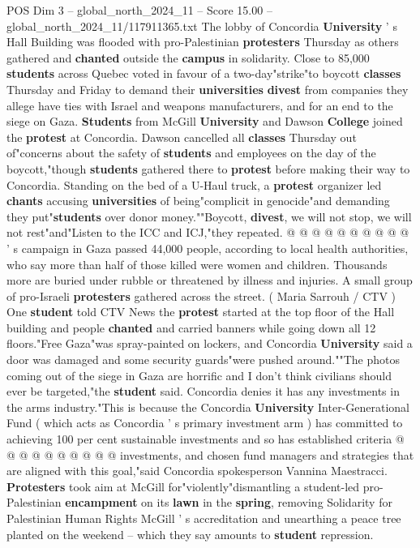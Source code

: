 \begin{textsample}{POS Dim 3 – global\_north\_2024\_11 – Score 15.00 – global\_north\_2024\_11/117911365.txt}  \label{ex:f3_pos_176}
The lobby of Concordia \textbf{University} ' s Hall Building was flooded with pro-Palestinian \textbf{protesters} Thursday as others gathered and \textbf{chanted} outside the \textbf{campus} in solidarity.
Close to 85,000 \textbf{students} across Quebec voted in favour of a two-day"strike"to boycott \textbf{classes} Thursday and Friday to demand their \textbf{universities} \textbf{divest} from companies they allege have ties with Israel and weapons manufacturers, and for an end to the siege on Gaza. \textbf{Students} from McGill \textbf{University} and Dawson \textbf{College} joined the \textbf{protest} at Concordia.
Dawson cancelled all \textbf{classes} Thursday out of"concerns about the safety of \textbf{students} and employees on the day of the boycott,"though \textbf{students} gathered there to \textbf{protest} before making their way to Concordia.
Standing on the bed of a U-Haul truck, a \textbf{protest} organizer led \textbf{chants} accusing \textbf{universities} of being"complicit in genocide"and demanding they put"\textbf{students} over donor money.""Boycott, \textbf{divest}, we will not stop, we will not rest"and"Listen to the ICC and ICJ,"they repeated. @ @ @ @ @ @ @ @ @ @ ' s campaign in Gaza passed 44,000 people, according to local health authorities, who say more than half of those killed were women and children.
Thousands more are buried under rubble or threatened by illness and injuries.
A small group of pro-Israeli \textbf{protesters} gathered across the street. ( Maria Sarrouh / CTV ) One \textbf{student} told CTV News the \textbf{protest} started at the top floor of the Hall building and people \textbf{chanted} and carried banners while going down all 12 floors."Free Gaza"was spray-painted on lockers, and Concordia \textbf{University} said a door was damaged and some security guards"were pushed around.""The photos coming out of the siege in Gaza are horrific and I don't think civilians should ever be targeted,"the \textbf{student} said.
Concordia denies it has any investments in the arms industry."This is because the Concordia \textbf{University} Inter-Generational Fund ( which acts as Concordia ' s primary investment arm ) has committed to achieving 100 per cent sustainable investments and so has established criteria @ @ @ @ @ @ @ @ @ @ investments, and chosen fund managers and strategies that are aligned with this goal,"said Concordia spokesperson Vannina Maestracci. \textbf{Protesters} took aim at McGill for"violently"dismantling a student-led pro-Palestinian \textbf{encampment} on its \textbf{lawn} in the \textbf{spring}, removing Solidarity for Palestinian Human Rights McGill ' s accreditation and unearthing a peace tree planted on the weekend -- which they say amounts to \textbf{student} repression.

\end{textsample}
